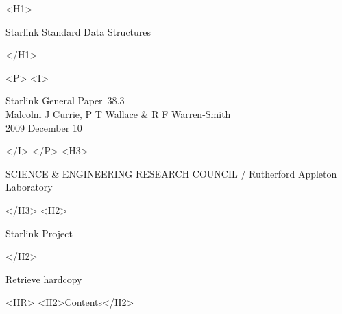 \documentclass[twoside,11pt]{article}
\newcommand{\stardoccategory}  {Starlink General Paper}
\newcommand{\stardocnumber}    {38.3}
\newcommand{\stardocsource}    {sgp\stardocnumber}
\newcommand{\stardocauthors}   {Malcolm J Currie, P T Wallace \&
                                R F Warren-Smith}
\newcommand{\stardocdate}      {2009 December 10}
\newcommand{\stardoctitle}     {Starlink Standard Data Structures}
\newcommand{\htmladdnormallink}[2]{#1}
\newcommand{\htmladdimg}[1]{}
\newcommand{\htmlref}[2]{#1}
\newcommand{\htmladdtonavigation}[1]{}
\newcommand{\xlabel}[1]{}
\renewcommand{\_}{\texttt{\symbol{95}}}
\begin{document}
\begin{htmlonly}
   \xlabel{}
   \begin{rawhtml} <H1> \end{rawhtml}
      \stardoctitle
   \begin{rawhtml} </H1> \end{rawhtml}


   \begin{rawhtml} <P> <I> \end{rawhtml}
   \stardoccategory\ \stardocnumber \\
   \stardocauthors \\
   \stardocdate
   \begin{rawhtml} </I> </P> <H3> \end{rawhtml}
      SCIENCE \& ENGINEERING RESEARCH COUNCIL /
      \htmladdnormallink{Rutherford Appleton Laboratory}
                        {http://www.cclrc.ac.uk/ral} \\
   \begin{rawhtml} </H3> <H2> \end{rawhtml}
      \htmladdnormallink{Starlink Project}{http://www.starlink.rl.ac.uk/}
   \begin{rawhtml} </H2> \end{rawhtml}
   \htmladdnormallink{\htmladdimg{source.gif} Retrieve hardcopy}
      {http://star-www.rl.ac.uk/cgi-bin/hcserver?\stardocsource}\\

  \label{stardoccontents}
  \begin{rawhtml} 
    <HR>
    <H2>Contents</H2>
  \end{rawhtml}
  \htmladdtonavigation{\htmlref{\htmladdimg{contents_motif.gif}}
        {stardoccontents}}


\end{htmlonly}
\end{document}
